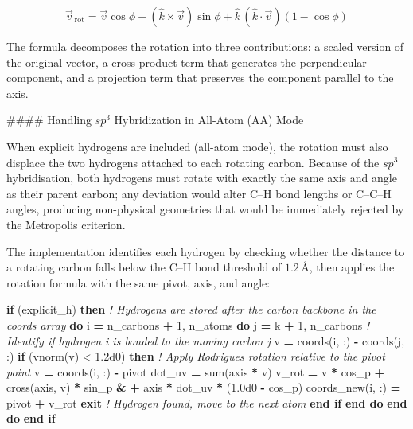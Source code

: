 \documentclass[
]{article}
\newenvironment{Shaded}{}{}
\newcommand{\CommentTok}[1]{\textcolor[rgb]{0.38,0.63,0.69}{\textit{#1}}}
\newcommand{\DecValTok}[1]{\textcolor[rgb]{0.25,0.63,0.44}{#1}}
\newcommand{\FloatTok}[1]{\textcolor[rgb]{0.25,0.63,0.44}{#1}}
\newcommand{\FunctionTok}[1]{\textcolor[rgb]{0.02,0.16,0.49}{#1}}
\newcommand{\KeywordTok}[1]{\textcolor[rgb]{0.00,0.44,0.13}{\textbf{#1}}}
\newcommand{\NormalTok}[1]{#1}
\newcommand{\OperatorTok}[1]{\textcolor[rgb]{0.40,0.40,0.40}{#1}}
\begin{document}
\[\vec{v}_{\,\text{rot}} = \vec{v}\cos\phi + (\hat{k} \times \vec{v})\sin\phi + \hat{k}\,(\hat{k} \cdot \vec{v})(1 - \cos\phi)\]

The formula decomposes the rotation into three contributions: a scaled
version of the original vector, a cross-product term that generates the
perpendicular component, and a projection term that preserves the
component parallel to the axis.

\#\#\#\# Handling \(sp^3\) Hybridization in All-Atom (AA) Mode

When explicit hydrogens are included (all-atom mode), the rotation must
also displace the two hydrogens attached to each rotating carbon.
Because of the \(sp^3\) hybridisation, both hydrogens must rotate with
exactly the same axis and angle as their parent carbon; any deviation
would alter C--H bond lengths or C--C--H angles, producing non-physical
geometries that would be immediately rejected by the Metropolis
criterion.

The implementation identifies each hydrogen by checking whether the
distance to a rotating carbon falls below the C--H bond threshold of
\(1.2\,\text{Å}\), then applies the rotation formula with the same
pivot, axis, and angle:

\begin{Shaded}
\begin{Highlighting}[]
\KeywordTok{if}\NormalTok{ (explicit\_h) }\KeywordTok{then}
  \CommentTok{! Hydrogens are stored after the carbon backbone in the coords array}
  \KeywordTok{do}\NormalTok{ i }\KeywordTok{=}\NormalTok{ n\_carbons }\KeywordTok{+} \DecValTok{1}\NormalTok{, n\_atoms}
    \KeywordTok{do}\NormalTok{ j }\KeywordTok{=}\NormalTok{ k }\KeywordTok{+} \DecValTok{1}\NormalTok{, n\_carbons}
      \CommentTok{! Identify if hydrogen i is bonded to the moving carbon j}
\NormalTok{      v }\KeywordTok{=}\NormalTok{ coords(i, :) }\KeywordTok{{-}}\NormalTok{ coords(j, :)}
      \KeywordTok{if}\NormalTok{ (vnorm(v) }\OperatorTok{\textless{}} \FloatTok{1.2d0}\NormalTok{) }\KeywordTok{then}
        \CommentTok{! Apply Rodrigues\textquotesingle{} rotation relative to the pivot point}
\NormalTok{        v }\KeywordTok{=}\NormalTok{ coords(i, :) }\KeywordTok{{-}}\NormalTok{ pivot}
\NormalTok{        dot\_uv }\KeywordTok{=} \FunctionTok{sum}\NormalTok{(axis }\KeywordTok{*}\NormalTok{ v)}
\NormalTok{        v\_rot }\KeywordTok{=}\NormalTok{ v }\KeywordTok{*}\NormalTok{ cos\_p }\KeywordTok{+}\NormalTok{ cross(axis, v) }\KeywordTok{*}\NormalTok{ sin\_p }\KeywordTok{\&}
              \KeywordTok{+}\NormalTok{ axis }\KeywordTok{*}\NormalTok{ dot\_uv }\KeywordTok{*}\NormalTok{ (}\FloatTok{1.0d0} \KeywordTok{{-}}\NormalTok{ cos\_p)}
\NormalTok{        coords\_new(i, :) }\KeywordTok{=}\NormalTok{ pivot }\KeywordTok{+}\NormalTok{ v\_rot}
        \KeywordTok{exit}  \CommentTok{! Hydrogen found, move to the next atom}
      \KeywordTok{end if}
    \KeywordTok{end do}
  \KeywordTok{end do}
\KeywordTok{end if}
\end{Highlighting}
\end{Shaded}
\end{document}
